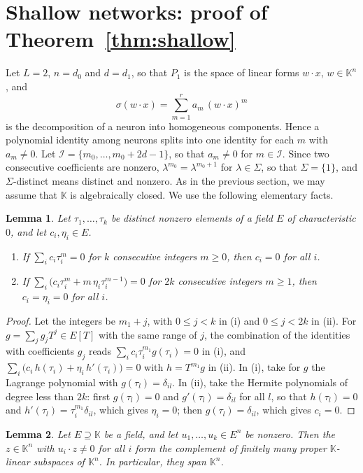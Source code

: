 \documentclass[11pt]{article}
\newtheorem{lemma}{Lemma}
\theoremstyle{definition}
\theoremstyle{remark}
\newcommand{\K}{\mathbb{K}}
\begin{document}
\section{Shallow networks: proof of Theorem~\ref{thm:shallow}}

Let $L=2$, $n=d_0$ and $d=d_1$, so that $P_1$ is the space of linear forms $w\cdot x$, $w\in\K^n$, and
\[
\sigma(w\cdot x)=\sum_{m=1}^ra_m\,(w\cdot x)^m
\]
is the decomposition of a neuron into homogeneous components. Hence a polynomial identity among neurons splits into one identity for each $m$ with $a_m\ne0$. Let $\mathcal I=\{m_0,\dots,m_0+2d-1\}$, so that $a_m\ne0$ for $m\in\mathcal I$. Since two consecutive coefficients are nonzero, $\lambda^{m_0}=\lambda^{m_0+1}$ for $\lambda\in\Sigma$, so that $\Sigma=\{1\}$, and $\Sigma$-distinct means distinct and nonzero. As in the previous section, we may assume that $\K$ is algebraically closed. We use the following elementary facts.

\begin{lemma}\label{lem:vdm}
Let $\tau_1,\dots,\tau_k$ be distinct nonzero elements of a field $E$ of characteristic $0$, and let $c_i,\eta_i\in E$.
\begin{enumerate}[label=\textup{(\roman*)},nosep]
\item If $\sum_ic_i\tau_i^m=0$ for $k$ consecutive integers $m\ge0$, then $c_i=0$ for all $i$.
\item If $\sum_i\big(c_i\tau_i^m+m\,\eta_i\tau_i^{m-1}\big)=0$ for $2k$ consecutive integers $m\ge1$, then $c_i=\eta_i=0$ for all $i$.
\end{enumerate}
\end{lemma}

\begin{proof}
Let the integers be $m_1+j$, with $0\le j<k$ in (i) and $0\le j<2k$ in (ii). For $g=\sum_jg_jT^j\in E[T]$ with the same range of $j$, the combination of the identities with coefficients $g_j$ reads $\sum_ic_i\tau_i^{m_1}g(\tau_i)=0$ in (i), and $\sum_i\big(c_i\,h(\tau_i)+\eta_i\,h'(\tau_i)\big)=0$ with $h=T^{m_1}g$ in (ii). In (i), take for $g$ the Lagrange polynomial with $g(\tau_l)=\delta_{il}$. In (ii), take the Hermite polynomials of degree less than $2k$: first $g(\tau_l)=0$ and $g'(\tau_l)=\delta_{il}$ for all $l$, so that $h(\tau_l)=0$ and $h'(\tau_l)=\tau_i^{m_1}\delta_{il}$, which gives $\eta_i=0$; then $g(\tau_l)=\delta_{il}$, which gives $c_i=0$.
\end{proof}

\begin{lemma}\label{lem:generic}
Let $E\supseteq\K$ be a field, and let $u_1,\dots,u_k\in E^n$ be nonzero. Then the $z\in\K^n$ with $u_i\cdot z\ne0$ for all $i$ form the complement of finitely many proper $\K$-linear subspaces of $\K^n$. In particular, they span $\K^n$.
\end{lemma}
\end{document}
